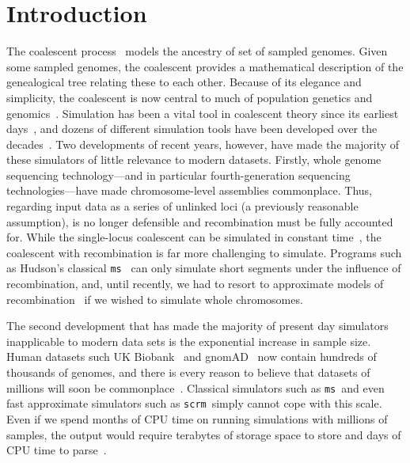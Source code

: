 \documentclass{article}
\newcommand{\ms}[0]{\texttt{ms}}
\newcommand{\scrm}[0]{\texttt{scrm}}
\begin{document}
\section*{Introduction}

The coalescent
process~\citep{kingman1982coalescent,hudson1983testing,tajima1983evolutionary}
models the ancestry of set of sampled genomes. Given some sampled
genomes, the coalescent provides a mathematical description of the
genealogical tree relating these to each other. Because of its
elegance and simplicity, the coalescent is now central to much of
population genetics and
genomics~\citep{hudson1990gene,hein2004gene,wakely2008coalescent}.
Simulation has been a vital
tool in coalescent theory since its earliest days~\citep{hudson1983testing},
and dozens of different simulation tools have been
developed over the decades~\citep{carvajal2008simulation,liu2008survey,
arenas2012simulation,yuan2012overview,hoban2012computer}.
Two developments of recent years, however, have made the majority
of these simulators of little relevance to modern datasets.
Firstly, whole genome sequencing technology---and in particular fourth-generation
sequencing technologies---have made chromosome-level assemblies
commonplace. Thus, regarding input data as a series of unlinked loci
(a previously reasonable assumption), is no longer defensible and
recombination must be fully accounted for. While the
single-locus coalescent can be simulated in constant
time~\citep{hudson1990gene}, the coalescent with recombination is
far more challenging to simulate.
Programs such as Hudson's classical \ms~\citep{hudson2002generating}
can only simulate short segments under the influence of recombination,
and, until recently, we had to resort to
approximate models of recombination~\citep{mcvean2005approximating,staab2014scrm}
if we wished to simulate whole chromosomes.

The second development that has made the majority of
present day simulators inapplicable to modern data sets is the
exponential increase in sample size. Human datasets such
UK Biobank~\citep{bycroft2018genome} and
gnomAD~\citep{karczewski2019variation} now contain hundreds of
thousands of genomes, and there is every reason to believe that
datasets of millions will soon be commonplace~\citep{stephens2015big}.
Classical simulators such as \ms\ and even fast approximate simulators
such as \scrm\ simply cannot cope with this scale. Even if we
spend months of CPU time on running simulations with millions of samples,
the output would require terabytes of storage space to store and
days of CPU time to parse~\citep{kelleher2016efficient}.
\end{document}
